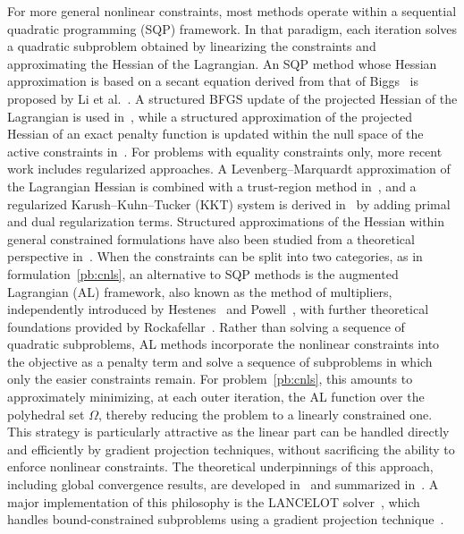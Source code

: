 \documentclass{article}
\numberwithin{equation}{section}
\theoremstyle{plain}
\begin{document}
For more general nonlinear constraints, most methods operate within a sequential quadratic programming (SQP) framework. In that paradigm, each iteration solves a quadratic subproblem obtained by linearizing the constraints and approximating the Hessian of the Lagrangian. An SQP method whose Hessian approximation is based on a secant equation derived from that of Biggs~\cite{biggs:1977} is proposed by Li et al.~\cite{li-etal:2002}. A structured BFGS update of the projected Hessian of the Lagrangian is used in~\cite{tjoabiegler:1991}, while a structured approximation of the projected Hessian of an exact penalty function is updated within the null space of the active constraints in~\cite{amiribartels:1989}.
For problems with equality constraints only, more recent work includes regularized approaches. A Levenberg--Marquardt approximation of the Lagrangian Hessian is combined with a trust-region method in~\cite{bergou-etal:2021}, and a regularized Karush--Kuhn--Tucker (KKT) system is derived in~\cite{orbansiqueira:2020} by adding primal and dual regularization terms.
Structured approximations of the Hessian within general constrained formulations have also been studied from a theoretical perspective in~\cite{tapia:1988}.
When the constraints can be split into two categories, as in formulation~\eqref{pb:cnls}, an alternative to SQP methods is the augmented Lagrangian (AL) framework, also known as the method of multipliers, independently introduced by Hestenes~\cite{hestenes:1969} and Powell~\cite{powell:1969}, with further theoretical foundations provided by Rockafellar~\cite{rockafellar:1973}.
Rather than solving a sequence of quadratic subproblems, AL methods incorporate the nonlinear constraints into the objective as a penalty term and solve a sequence of subproblems in which only the easier constraints remain.
For problem~\eqref{pb:cnls}, this amounts to approximately minimizing, at each outer iteration, the AL function over the polyhedral set $\Omega$, thereby reducing the problem to a linearly constrained one. This strategy is particularly attractive as the linear part can be handled directly and efficiently by gradient projection techniques, without sacrificing the ability to enforce nonlinear constraints.
The theoretical underpinnings of this approach, including global convergence results, are developed in~\cite{conn-etal:1988a,conn-etal:1991, conn-etal:1993, conn-etal:1996b} and summarized in~\cite[Chapter~14]{conn-etal:2000}.
A major implementation of this philosophy is the LANCELOT solver~\cite{conn-etal:1992}, which handles bound-constrained subproblems using a gradient projection technique~\cite{conn-etal:1988b}.
\end{document}
